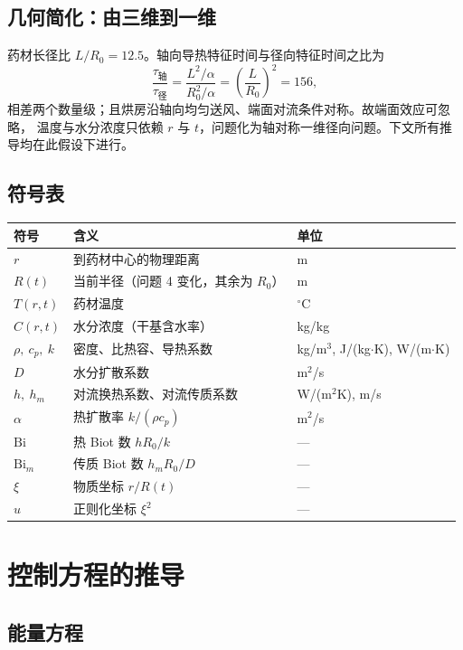 \documentclass[11pt,a4paper]{article}
\theoremstyle{definition}
\begin{document}
\subsection{几何简化：由三维到一维}

药材长径比 $L/R_0=12.5$。轴向导热特征时间与径向特征时间之比为
\[
\frac{\tau_{\text{轴}}}{\tau_{\text{径}}}=\frac{L^2/\alpha}{R_0^2/\alpha}
=\left(\frac{L}{R_0}\right)^2=156 ,
\]
相差两个数量级；且烘房沿轴向均匀送风、端面对流条件对称。故端面效应可忽略，
温度与水分浓度只依赖 $r$ 与 $t$，问题化为轴对称一维径向问题。下文所有推导均在此假设下进行。

\subsection{符号表}

\begin{center}
\small
\begin{tabular}{@{}lll@{}}
\toprule
符号 & 含义 & 单位 \\
\midrule
$r$ & 到药材中心的物理距离 & m \\
$R(t)$ & 当前半径（问题 4 变化，其余为 $R_0$） & m \\
$T(r,t)$ & 药材温度 & $^\circ$C \\
$C(r,t)$ & 水分浓度（干基含水率） & kg/kg \\
$\rho,\ c_p,\ k$ & 密度、比热容、导热系数 & kg/m$^3$, J/(kg$\cdot$K), W/(m$\cdot$K) \\
$D$ & 水分扩散系数 & m$^2$/s \\
$h,\ h_m$ & 对流换热系数、对流传质系数 & W/(m$^2$K), m/s \\
$\alpha$ & 热扩散率 $k/(\rho c_p)$ & m$^2$/s \\
$\mathrm{Bi}$ & 热 Biot 数 $hR_0/k$ & --- \\
$\mathrm{Bi}_m$ & 传质 Biot 数 $h_mR_0/D$ & --- \\
$\xi$ & 物质坐标 $r/R(t)$ & --- \\
$u$ & 正则化坐标 $\xi^2$ & --- \\
\bottomrule
\end{tabular}
\end{center}

\section{控制方程的推导}

\subsection{能量方程}
\end{document}
